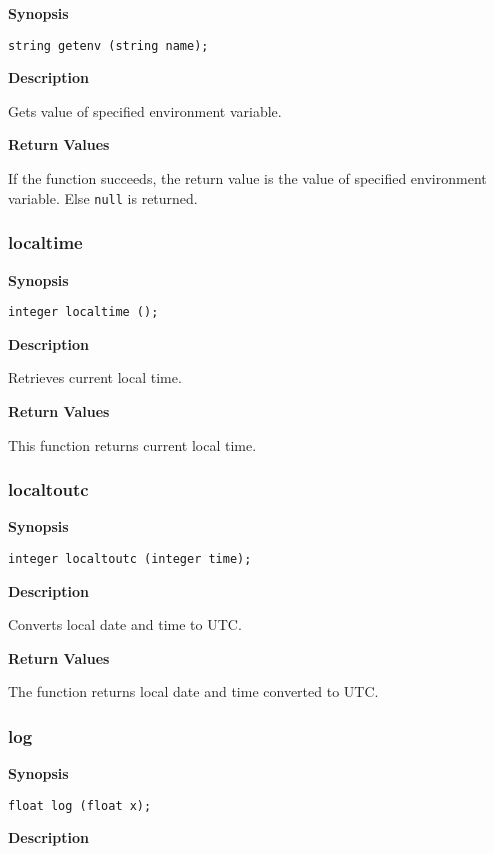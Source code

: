 \documentclass[a4paper, 10pt, titlepage]{article}
\begin{document}
\textbf{Synopsis}

\begin{verbatim}
string getenv (string name);
\end{verbatim}

\textbf{Description}

Gets value of specified environment variable.

\textbf{Return Values}

If the function succeeds, the return value is the value of specified environment variable. Else \texttt{null} is returned.

\subsubsection{localtime}

\textbf{Synopsis}

\begin{verbatim}
integer localtime ();
\end{verbatim}

\textbf{Description}

Retrieves current local time.

\textbf{Return Values}

This function returns current local time.

\subsubsection{localtoutc}

\textbf{Synopsis}

\begin{verbatim}
integer localtoutc (integer time);
\end{verbatim}

\textbf{Description}

Converts local date and time to UTC.

\textbf{Return Values}

The function returns local date and time converted to UTC.

\subsubsection{log}

\textbf{Synopsis}

\begin{verbatim}
float log (float x);
\end{verbatim}

\textbf{Description}
\end{document}
